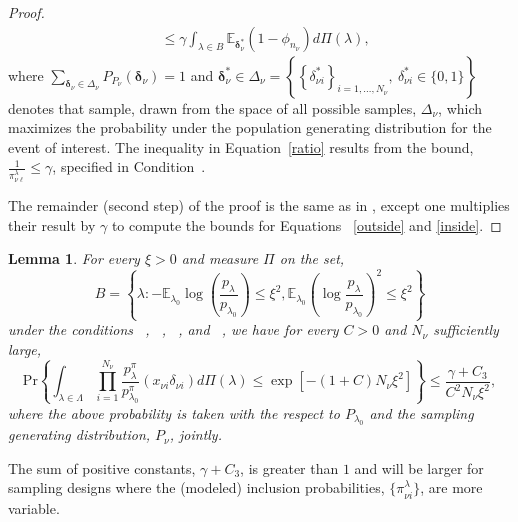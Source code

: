 \documentclass[]{imsart}
\newtheorem{lemma}[theorem]{Lemma}
\begin{document}
\begin{proof}
\begin{align}
&\leq\gamma\mathop{\int}_{\lambda\in B}\mathbb{E}_{\bm{\delta}^{\ast}_{\nu}}\left(1-\phi_{n_{\nu}}\right)d\Pi\left(\lambda\right)\nonumber,
\end{align}
where $\displaystyle\mathop{\sum}_{\bm{\delta}_{\nu}\in\Delta_{\nu}}P_{P_{\nu}}\left(\bm{\delta}_{\nu}\right) = 1$ \citep{model2003sarndal} and
\newline $\bm{\delta}^{\ast}_{\nu}\in \Delta_{\nu} = \left\{\left\{\delta^{\ast}_{\nu i}\right\}_{i = 1,\ldots,N_{\nu}},~\delta^{\ast}_{\nu i}\in\{0,1\} \right\}$ denotes that sample, drawn from the space of all possible samples, $\Delta_{\nu}$, which maximizes the probability under the population generating distribution for the event of interest.  The inequality in Equation~\eqref{ratio} results from the bound, $\frac{1}{\pi_{\nu\ell}^{\lambda}}\leq \gamma$, specified in Condition~.


The remainder (second step) of the proof is the same as in \citet{savitsky2016bayesian}, except one multiplies their result by $\gamma$ to compute the bounds for Equations ~\eqref{outside} and \eqref{inside}.

\end{proof}

\begin{lemma}\label{denominator}
For every $\xi > 0$ and measure $\Pi$ on the set,
\begin{equation*}
B = \left\{\lambda:-\mathbb{E}_{\lambda_{0}}\log\left(\frac{p_{\lambda}}{p_{\lambda_{0}}}\right) \leq \xi^2, \mathbb{E}_{\lambda_{0}}\left(\log\frac{p_{\lambda}}{p_{\lambda_{0}}}\right)^{2} \leq \xi^{2}\right\}
\end{equation*}
under the conditions ~, ~, ~, and ~, we have for every $C > 0 $ and $N_{\nu}$ sufficiently large,
\begin{equation}\label{denomresult}
\mbox{Pr}\left\{\mathop{\int}_{\lambda\in\Lambda}\displaystyle\mathop{\prod}_{i=1}^{N_{\nu}}\frac{p_{\lambda}^{\pi}}{p_{\lambda_{0}}^{\pi}}
\left(x_{\nu i}\delta_{\nu i}\right)d\Pi\left(\lambda\right)\leq \exp\left[-(1+C)N_{\nu}\xi^{2}\right]\right\}
\leq \frac{\gamma+C_{3}}{C^{2} N_{\nu}\xi^{2}},
\end{equation}
where the above probability is taken with the respect to $P_{\lambda_{0}}$ and the sampling generating distribution, $P_{\nu}$, jointly.
\end{lemma}

The sum of positive constants, $\gamma + C_{3}$, is greater than $1$ and will be larger for sampling designs where the (modeled) inclusion probabilities, $\{\pi_{\nu i}^{\lambda}\}$, are more variable.
\end{document}
